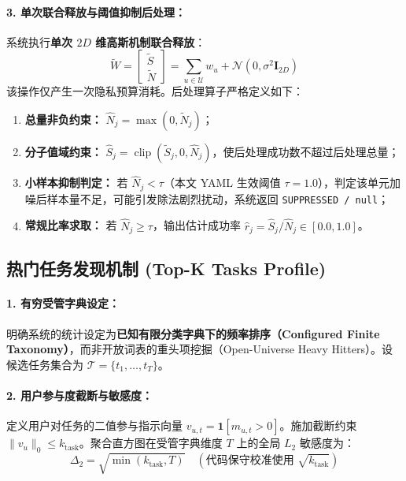 \paragraph{3. 单次联合释放与阈值抑制后处理：}
系统执行\textbf{单次 $2D$ 维高斯机制联合释放}：
\begin{equation}
  \tilde{W} = \begin{bmatrix} \tilde{S} \\ \tilde{N} \end{bmatrix} = \sum_{u \in \mathcal{U}} w_u + \mathcal{N}\left(0, \sigma^2 \mathbf{I}_{2D}\right)
\end{equation}
该操作仅产生一次隐私预算消耗。后处理算子严格定义如下：
\begin{enumerate}[label=\textbf{步骤\arabic*：}, leftmargin=4.5em]
  \item \textbf{总量非负约束：} $\hat{N}_j = \max(0, \tilde{N}_j)$；
  \item \textbf{分子值域约束：} $\hat{S}_j = \operatorname{clip}(\tilde{S}_j, 0, \hat{N}_j)$，使后处理成功数不超过后处理总量；
  \item \textbf{小样本抑制判定：} 若 $\hat{N}_j < \tau$（本文 YAML 生效阈值 $\tau = 1.0$），判定该单元加噪后样本量不足，可能引发除法剧烈扰动，系统返回 \texttt{SUPPRESSED / null}；
  \item \textbf{常规比率求取：} 若 $\hat{N}_j \ge \tau$，输出估计成功率 $\hat{r}_j = \hat{S}_j / \hat{N}_j \in [0.0, 1.0]$。
\end{enumerate}

\subsection{热门任务发现机制 (Top-K Tasks Profile)}
\paragraph{1. 有穷受管字典设定：}
明确系统的统计设定为\textbf{已知有限分类字典下的频率排序（Configured Finite Taxonomy）}，而非开放词表的重头项挖掘（Open-Universe Heavy Hitters）。设候选任务集合为 $\mathcal{T} = \{t_1, \dots, t_T\}$。

\paragraph{2. 用户参与度截断与敏感度：}
定义用户对任务的二值参与指示向量 $v_{u, t} = \mathbf{1}[m_{u, t} > 0]$。施加截断约束 $\|v_u\|_0 \le k_{\text{task}}$。聚合直方图在受管字典维度 $T$ 上的全局 $L_2$ 敏感度为：
\begin{equation}
  \Delta_2 = \sqrt{\min(k_{\text{task}}, T)} \quad (\text{代码保守校准使用 } \sqrt{k_{\text{task}}})
\end{equation}

